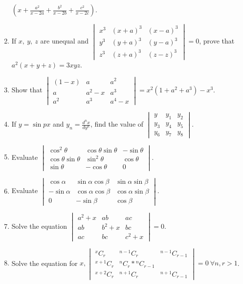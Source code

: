 \begin{enumerate}[resume]
  $\left(x + \frac{a^2}{x - 2a} + \frac{b^2}{x - 2b} + \frac{c^2}{x - 2c}\right)$.
\item If $x,\ y,\ z$ are unequal and $\begin{vmatrix}x^3 & (x + a)^3 & (x - a)^3\\y^3 & (y + a)^3 & (y - a)^3\\z^3 & (z + a)^3 & (z
  - z)^3\end{vmatrix} = 0$, prove that $a^2(x + y + z) = 3xyz$.
\item Show that $\begin{vmatrix}(1 - x) & a & a^2\\a & a^2 - x & a^3\\a^2 & a^3 & a^4 - x\end{vmatrix} = x^2(1 + a^2 + a^3) - x^3$.
\item If $y = \sin px$ and $y_n = \frac{d^nx}{dy^n}$, find the value of $\begin{vmatrix}y & y_1 & y_2\\y_3 & y_4 & y_5\\y_6 & y_7
  & y_8\end{vmatrix}$.
\item Evaluate $\begin{vmatrix}\cos^2\theta & \cos\theta\sin\theta & -\sin\theta\\\cos\theta\sin\theta & \sin^2\theta &
  \cos\theta\\\sin\theta & -\cos\theta & 0\end{vmatrix}$.
\item Evaluate $\begin{vmatrix}\cos\alpha & \sin\alpha\cos\beta & \sin\alpha\sin\beta\\-\sin\alpha & \cos\alpha\cos\beta &
  \cos\alpha\sin\beta\\0 & -\sin\beta & \cos\beta\end{vmatrix}$.
\item Solve the equation $\begin{vmatrix}a^2 + x & ab & ac\\ab & b^2 + x & bc\\ac & bc & c^2 + x\end{vmatrix} = 0$.
\item Solve the equation for $x, \begin{vmatrix}{}^xC_r & {}^{n - 1}C_r & {}^{n - 1}C_{r - 1}\\{}^{x + 1}C_r & {}^nC_r * {}^nC_{r -
    1}\\{}^{x + 2}C_r & {}^{n + 1}C_r & {}^{n + 1}C_{r - 1}\end{vmatrix} = 0\ \forall n,r > 1$.

\end{enumerate}
